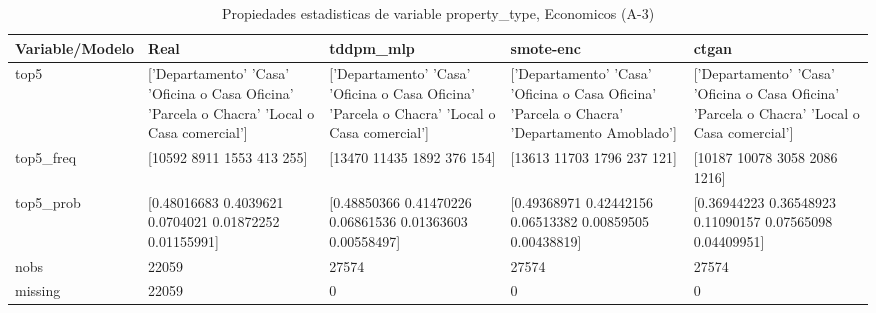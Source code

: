 \begin{table}[H]
\centering
\fontsize{8}{14}\selectfont
\caption{Propiedades  estadisticas de variable property\_type, Economicos (A-3)}
\label{table-stats-economicos-a-3-property_type}
\begin{tabular}{|l|m{10em}|m{10em}|m{10em}|m{10em}|}
\hline
 \rowcolor[gray]{0.8}
Variable/Modelo & Real & tddpm\_mlp & smote-enc & ctgan \\
\hline top5 & ['Departamento' 'Casa' 'Oficina o Casa Oficina' 'Parcela o Chacra'
 'Local o Casa comercial'] & ['Departamento' 'Casa' 'Oficina o Casa Oficina' 'Parcela o Chacra'
 'Local o Casa comercial'] & ['Departamento' 'Casa' 'Oficina o Casa Oficina' 'Parcela o Chacra'
 'Departamento Amoblado'] & ['Departamento' 'Casa' 'Oficina o Casa Oficina' 'Parcela o Chacra'
 'Local o Casa comercial'] \\
\hline top5\_freq & [10592  8911  1553   413   255] & [13470 11435  1892   376   154] & [13613 11703  1796   237   121] & [10187 10078  3058  2086  1216] \\
\hline top5\_prob & [0.48016683 0.4039621  0.0704021  0.01872252 0.01155991] & [0.48850366 0.41470226 0.06861536 0.01363603 0.00558497] & [0.49368971 0.42442156 0.06513382 0.00859505 0.00438819] & [0.36944223 0.36548923 0.11090157 0.07565098 0.04409951] \\
\hline nobs & 22059 & 27574 & 27574 & 27574 \\
\hline missing & 22059 & 0 & 0 & 0 \\
\hline
\end{tabular}
\end{table}
